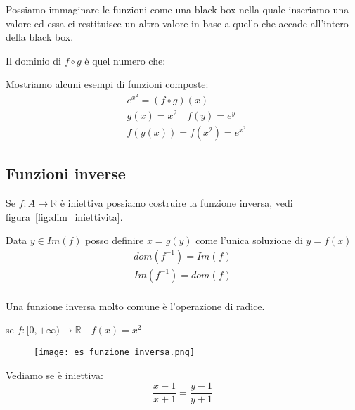 \documentclass[../main.tex, class=article, 12pt]{subfiles}
\begin{document}
\begin{tcolorbox}
Possiamo immaginare le funzioni come una black box nella quale inseriamo una valore ed essa ci restituisce un altro valore in base a quello che accade all'intero della black box.
\end{tcolorbox}


Il dominio di $ f \circ g $ è quel numero che:

\begin{exmp}
        Mostriamo alcuni esempi di funzioni composte:
        \begin{align*}
                & e^{x^2} = (f \circ g)(x) \\
                & g(x) = x^2 \quad f(y) = e^y \\
                & f(y(x)) = f(x^2) = e^{x^2}
        \end{align*}
\end{exmp}



\newpage
\subsection{Funzioni inverse}\label{sec:funzione_inversa}
Se $ f : A \to \mathbb{R} $ è iniettiva possiamo costruire la funzione inversa, vedi figura~\ref{fig:dim_iniettivita}. \par
Data $ y \in Im(f) $ posso definire $ x = g(y) $ come l'unica soluzione di $ y = f(x) $
\begin{align*}
        dom(f^{-1}) = Im(f) \\
        Im(f^{-1}) = dom(f) \\
\end{align*}

Una funzione inversa molto comune è l'operazione di radice.

\begin{exmp}
        se $ f : [0, +\infty) \to \mathbb{R} \quad  f(x) = x^2$
        \begin{figure}[H]
          	\texttt{[image: es\_funzione\_inversa.png]}
          	\caption{}
                \label{fig:es_funzione_inversa}
        \end{figure}

        Vediamo se è iniettiva:
        \begin{equation*}
                \frac{x-1}{x+1} = \frac{y-1}{y+1} 
        \end{equation*}
\end{exmp}
\end{document}
